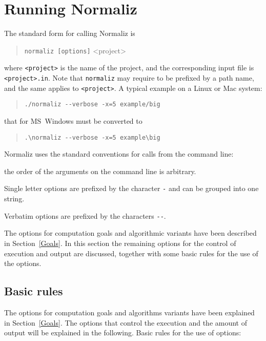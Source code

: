 \section{Running Normaliz}\label{options}

The standard form for calling Normaliz is
\begin{quote}
	\verb|normaliz [options]| <project>
\end{quote}
where \verb|<project>| is the name of the project, and the corresponding input file is \verb|<project>.in|. Note that \verb|normaliz| may require to be prefixed by a path name, and the same applies to \verb|<project>|. A typical example on a Linux or Mac system:
\begin{quote}
	\verb|./normaliz --verbose -x=5 example/big|
\end{quote}
that for MS~Windows must be converted to
\begin{quote}
	\verb|.\normaliz --verbose -x=5 example\big|
\end{quote}

Normaliz uses the standard conventions for calls from the command line:
\begin{arab}
	\item the order of the arguments on the command line is arbitrary.
	\item Single letter options are prefixed by the character \verb|-| and can be grouped into one string.
	\item Verbatim options are prefixed by the characters \verb|--|.
\end{arab}

The options for computation goals and algorithmic variants have been described in Section~\ref{Goals}. In this section the remaining options for the control of execution and output are discussed, together with some basic rules for the use of the options.

\subsection{Basic rules}
The options for computation goals and algorithms variants have been explained in Section~\ref{Goals}. The options that control the execution and the amount of output will be explained in the following. Basic rules for the use of options:

